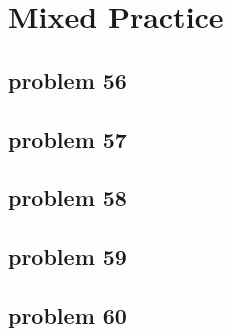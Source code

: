 \section{Mixed Practice}

\subsection{problem 56}


\subsection{problem 57}


\subsection{problem 58}


\subsection{problem 59}


\subsection{problem 60}

